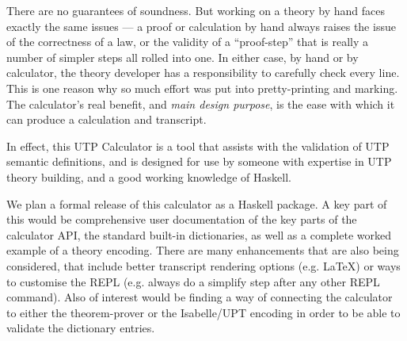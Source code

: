 There are no guarantees of soundness.
But working on a theory by hand faces exactly the same issues
--- a proof or calculation by hand always raises the issue
of the correctness of a law, or the validity of a ``proof-step''
that is really a number of simpler steps all rolled into one.
In either case, by hand or by calculator,
the theory developer has a responsibility to carefully check every line.
This is one reason why so much effort was put into pretty-printing
and marking.
The calculator's real benefit, and\emph{ main design purpose},
is the ease with which
it can produce a calculation and transcript.


In effect, this UTP Calculator is a tool that assists
with the validation of UTP semantic definitions,
and is designed for use by someone with expertise
in UTP theory building,
and a good working knowledge of Haskell.



We plan a formal release of this calculator as a Haskell package.
A key part of this would be comprehensive
user documentation of the key parts of the calculator API,
the standard built-in dictionaries,
as well as a complete worked example of a theory encoding.
There are many enhancements that are also being considered,
that include better transcript rendering options
(e.g. \LaTeX) or ways to customise the REPL
(e.g. always do a simplify step after any other REPL command).
Also of interest would be finding
a way of connecting the calculator
to either the  theorem-prover\cite{DBLP:conf/utp/Butterfield10}
or the Isabelle/UPT encoding\cite{DBLP:conf/utp/FosterZW14}
in order to be able to validate the dictionary entries.
